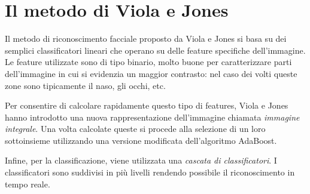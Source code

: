 \section{Il metodo di Viola e Jones}

Il metodo di riconoscimento facciale proposto da Viola e Jones si basa su dei semplici classificatori lineari che operano su delle feature specifiche dell'immagine. Le feature utilizzate sono di tipo binario, molto buone per caratterizzare parti dell'immagine in cui si evidenzia un maggior contrasto: nel caso dei volti queste zone sono tipicamente il naso, gli occhi, etc.

Per consentire di calcolare rapidamente questo tipo di features, Viola e Jones hanno introdotto una nuova rappresentazione dell'immagine chiamata \emph{immagine integrale}. Una volta calcolate queste si procede alla selezione di un loro sottoinsieme utilizzando una versione modificata dell'algoritmo AdaBoost. 

Infine, per la classificazione, viene utilizzata una \emph{cascata di classificatori}. I classificatori sono suddivisi in più livelli rendendo possibile il riconoscimento in tempo reale.